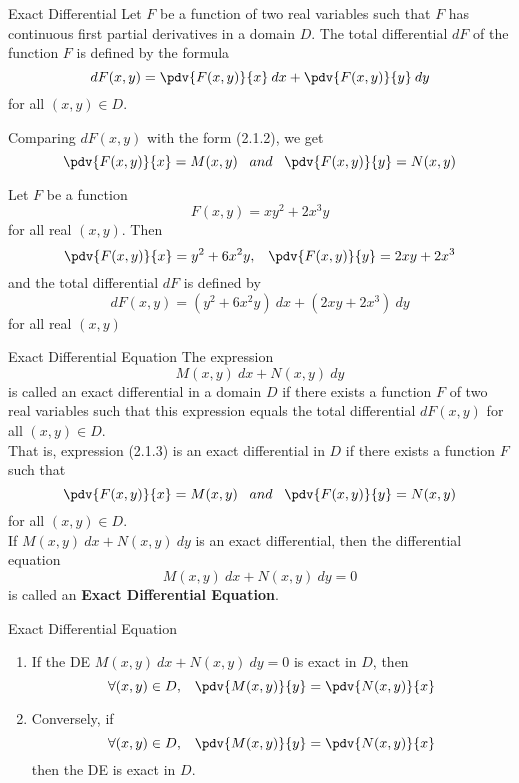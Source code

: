 \begin{definition}{Exact Differential}{}
    Let $F$ be a function of two real variables such that  $F$ has continuous first partial derivatives in a domain $D$. The total differential $dF$ of the function $F$ is defined by the formula
    \[
        d{F(x,y)} = \pdv{F(x,y)}{x} \: dx + \pdv{F(x,y)}{y} \: dy
    \]
    for all $(x,y) \in D$.
\end{definition} \vspace{0.25cm}

Comparing $dF(x,y)$ with the form (2.1.2), we get
\[
    \pdv{F(x,y)}{x} = M(x,y) \;\;\; and \;\;\;
    \pdv{F(x,y)}{y} = N(x,y)
\]

\begin{example}{}{}
    Let $F$ be a function \[
        F(x,y) = xy^2 + 2x^3y
    \] for all real $(x,y)$. Then
    \[
        \pdv{F(x,y)}{x} = y^2 + 6x^2y ,\;\;\;
        \pdv{F(x,y)}{y} = 2xy + 2x^3
    \]
    and the total differential $dF$ is defined by \[
        dF(x,y) = (y^2 + 6x^2y) \: dx + (2xy + 2x^3) \: dy
    \]
    for all real $(x,y)$
\end{example}

\begin{definition}{Exact Differential Equation}{}
    The expression
    \begin{equation}
        M(x,y) \: d{x} + N(x,y) \: d{y}
    \end{equation}
    is called an exact differential in a domain $D$ if there exists a function $F$ of two real variables such that this expression equals the total differential $dF(x,y)$ for all $(x,y) \in D$. \\
    That is, expression (2.1.3) is an exact differential in $D$ if there exists a function $F$ such that
\[
    \pdv{F(x,y)}{x} = M(x,y) \;\;\; and \;\;\;
    \pdv{F(x,y)}{y} = N(x,y)
\]
for all $(x,y) \in D$. \\
If $M(x,y) \: d{x} + N(x,y) \: d{y}$ is an exact differential, then the differential equation
\[ M(x,y) \: d{x} + N(x,y) \: d{y} = 0 \]
is called an \textbf{Exact Differential Equation}.
\end{definition}

\begin{theorem}{Exact Differential Equation}{}
    \begin{enumerate}
        \item If the DE $M(x,y) \: d{x} + N(x,y) \: d{y} = 0$ is exact in $D$, then
            \[ \forall (x,y)\in D, \;\;\; \pdv{M(x,y)}{y} = \pdv{N(x,y)}{x} \]
        \item Conversely, if 
            \[ \forall (x,y)\in D, \;\;\; \pdv{M(x,y)}{y} = \pdv{N(x,y)}{x} \]
        then the DE is exact in $D$.
    \end{enumerate}
\end{theorem} \vspace{0.5cm}

